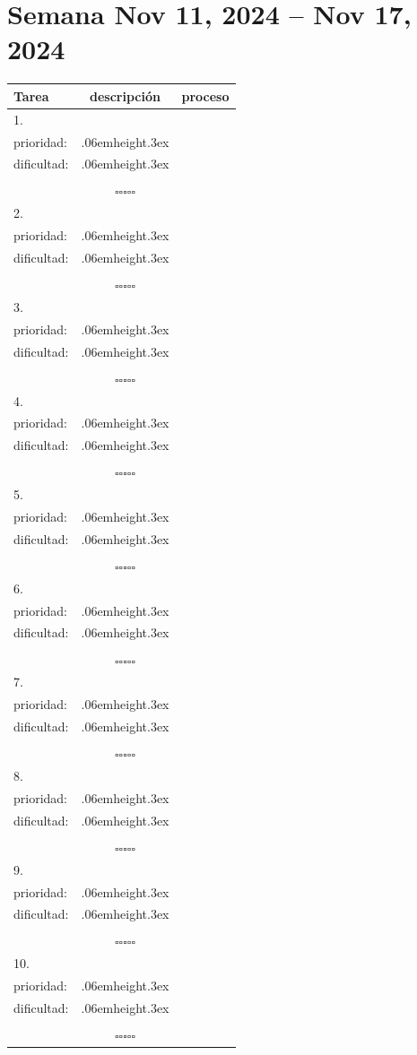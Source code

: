 \documentclass[a4paper,12pt, tikz]{scrartcl}
\newcommand\Vtextvisiblespace[1][.3em]{%
  \mbox{\kern.06em\vrule height.3ex}%
  \vbox{\hrule width#1}%
  \hbox{\vrule height.3ex}}
\newcommand{\subtablaDescrip}{ \begin{tabular}{ll}&\\ prioridad: & \Vtextvisiblespace[2em] \\ dificultad: & \Vtextvisiblespace[2em]\\&\\ \end{tabular}}
\begin{document}
\section*{Semana Nov 11, 2024 -- Nov 17, 2024}
\thispagestyle{empty}
\noindent
\begin{tabularx}{\linewidth}{|X|c c|}
    \hline
  \textbf{Tarea} & \textbf{descripción} & \textbf{proceso}\\
  \hline
   1.\vspace{4ex} &      \subtablaDescrip     & $\square\square\square\square\square$ \\
  \hline
  2.\vspace{4ex} &      \subtablaDescrip     & $\square\square\square\square\square$ \\
  \hline
  3.\vspace{4ex} &      \subtablaDescrip     & $\square\square\square\square\square$ \\
  \hline
  4.\vspace{4ex} &      \subtablaDescrip     & $\square\square\square\square\square$ \\
  \hline
  5.\vspace{4ex} &      \subtablaDescrip     & $\square\square\square\square\square$ \\
  \hline
  6.\vspace{4ex} &      \subtablaDescrip     & $\square\square\square\square\square$ \\
  \hline
  7.\vspace{4ex} &      \subtablaDescrip     & $\square\square\square\square\square$ \\
  \hline
  8.\vspace{4ex} &      \subtablaDescrip     & $\square\square\square\square\square$ \\
  \hline
  9.\vspace{4ex} &      \subtablaDescrip     & $\square\square\square\square\square$ \\
  \hline
  10.\vspace{4ex} &      \subtablaDescrip     & $\square\square\square\square\square$ \\
  \hline
\end{tabularx}

\newpage
\end{document}
